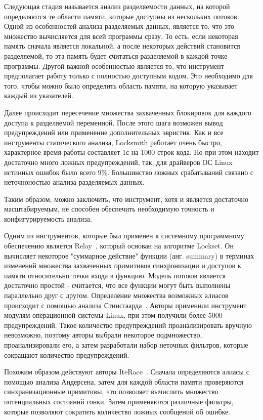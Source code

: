 Следующая стадия называется анализ разделяемости данных, на которой определяются те области памяти, которые доступны из нескольких потоков.
Одной из особенностей анализа разделяемых данных, является то, что это множество вычисляется для всей программы сразу. 
То есть, если некоторая память сначала является локальной, а после некоторых действий становится разделяемой, то эта память будет считаться разделяемой в каждой точке программы.
Другой важной особенностью является то, что инструмент предполагает работу только с полностью доступным кодом.
Это необходимо для того, чтобы можно было определить область памяти, на которую указывает каждый из указателей.

Далее происходит пересечение множества захваченных блокировок для каждого доступа к разделяемой переменной.
После этого шага возможен вывод предупреждений или применение дополнительных эвристик.
Как и все инструменты статического анализа, Locksmith работает очень быстро, характерное время работы составляет 1с на 1000 строк кода.
Но при этом находит достаточно много ложных предупреждений, так, для драйверов ОС Linux истинных ошибок было всего 9\%.
Большинство ложных срабатываний связано с неточноностью анализа разделяемых данных.

Таким образом, можно заключить, что инструмент, хотя и является достаточно масштабируемым, не способен обеспечить необходимую точность и конфигурируемость анализа.

Одним из инструментов, которые был применен к системному программному обеспечению является Relay~\cite{Relay}, который основан на алгоритме Lockset.
Он вычисляет некоторое "суммарное действие" функции (анг. summary) в терминах изменений множества захваченных примитивов синхронизации и доступов к памяти относительно точки входа в функцию.
Модель потоков является достаточно простой - считается, что все функции могут быть выполнены параллельно друг с другом.
Определение множества возможных алиасов происходит с помощью анализа Стинсгаарда~\cite{Steensgaard:1996}.
Авторы применили инструмент модулям операционной системы Linux, при этом получили более 5000 предупреждений.
Такое количество предупреждений проанализировать вручную невозможно, поэтому авторы выбрали некоторое подмножество, проанализировали его, а затем разработали набор неточных фильтров, которые сокращают количество предупреждений.

Похожим образом действуют авторы IteRace~\cite{Radoi:2015:ETS}.
Сначала определяются алиасы с помощью анализа Андерсена, затем для каждой области памяти проверяются синхранизационные примитивы, что позволяет вычислить множество потенциальных состояний гонки.
Затем применяются различные фильтры, которые позволяют сократить количество ложных сообщений об ошибке.


